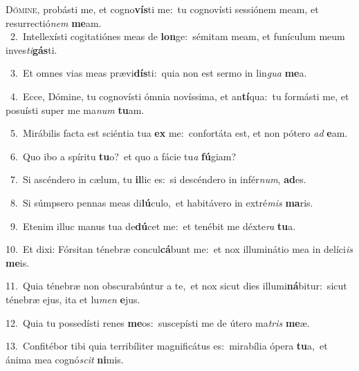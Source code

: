 \lettrine{\initial\textcolor{\initialcolor}{D}}{ómine,} probásti me, et cogno\-\textbf{vís}\-ti me:~\star tu cognovísti sessiónem meam, et resurrectió\textit{nem} \textbf{me}\-am.\\
{\numbfont\textcolor{\numbcolor}{~2.}}~Intellexísti cogitatiónes meas de \textbf{lon}\-ge:~\star sémitam meam, et funículum meum inves\-\textit{ti}\-\textbf{gás}ti.\par
{\numbfont\textcolor{\numbcolor}{~3.}}~Et omnes vias meas prævi\-\textbf{dís}\-ti:~\star quia non est sermo in lin\textit{gua} \textbf{me}\-a.\par
{\numbfont\textcolor{\numbcolor}{~4.}}~Ecce, Dómine, tu cognovísti ómnia novíssima, et an\-\textbf{tí}\-qua:~\star tu formásti me, et posuísti super me ma\textit{num} \textbf{tu}\-am.\par
{\numbfont\textcolor{\numbcolor}{~5.}}~Mirábilis facta est sciéntia tua \textbf{ex} me:~\star confortáta est, et non pótero \textit{ad} \textbf{e}\-am.\par
{\numbfont\textcolor{\numbcolor}{~6.}}~Quo ibo a spíritu \textbf{tu}\-o?~\star et quo a fácie tu\textit{a} \textbf{fú}\-giam?\par
{\numbfont\textcolor{\numbcolor}{~7.}}~Si ascéndero in cælum, tu \textbf{il}\-lic es:~\star si descéndero in infér\-\textit{num}\-, \textbf{ad}\-es.\par
{\numbfont\textcolor{\numbcolor}{~8.}}~Si súmpsero pennas meas di\-\textbf{lú}\-culo,~\star et habitávero in extré\textit{mis} \textbf{ma}\-ris.\par
{\numbfont\textcolor{\numbcolor}{~9.}}~Etenim illuc manus tua de\-\textbf{dú}\-cet me:~\star et tenébit me déxte\textit{ra} \textbf{tu}\-a.\par
{\numbfont\textcolor{\numbcolor}{10.}}~Et dixi: Fórsitan ténebræ concul\-\textbf{cá}\-bunt me:~\star et nox illuminátio mea in delíci\textit{is} \textbf{me}\-is.\par
{\numbfont\textcolor{\numbcolor}{11.}}~Quia ténebræ non obscurabúntur a te,~\dagger et nox sicut dies illumi\-\textbf{ná}\-bitur:~\star sicut ténebræ ejus, ita et lu\textit{men} \textbf{e}\-jus.\par
{\numbfont\textcolor{\numbcolor}{12.}}~Quia tu possedísti renes \textbf{me}\-os:~\star suscepísti me de útero ma\textit{tris} \textbf{me}\-æ.\par
{\numbfont\textcolor{\numbcolor}{13.}}~Confitébor tibi quia terribíliter magnificátus es:~\dagger mirabília ópera \textbf{tu}\-a,~\star et ánima mea cognó\textit{scit} \textbf{ni}\-mis.\par
